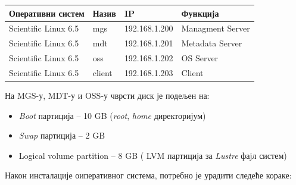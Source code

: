 \begin{center}
    \begin{tabular}{ | l | l | l | p{5cm} |}
    \hline
    \textbf{Оперативни систем} & \textbf{Назив} & \textbf{IP } & \textbf{Функција} \\ \hline
Scientific Linux 6.5 & mgs &  192.168.1.200 & Managment Server \\ \hline
Scientific Linux 6.5 & mdt &  192.168.1.201 & Metadata Server \\ \hline
Scientific Linux 6.5 & oss &  192.168.1.202 & OS Server \\ \hline
Scientific Linux 6.5 & client &  192.168.1.203 & Client \\ \hline
    \end{tabular}

\end{center}

На MGS-у, MDT-у и OSS-у чврсти диск је подељен на:
\begin{itemize}
\item \textit{Boot} партиција – 10 GB (\textit{root}, \textit{home} директоријум)

\item \textit{Swap} партиција – 2 GB

\item Logical volume partition – 8 GB ( \gls{LVM} партиција за   \textit{Lustre} фајл систем)
\end{itemize}


Након инсталације оиперативног система, потребно је урадити следеће кораке:

